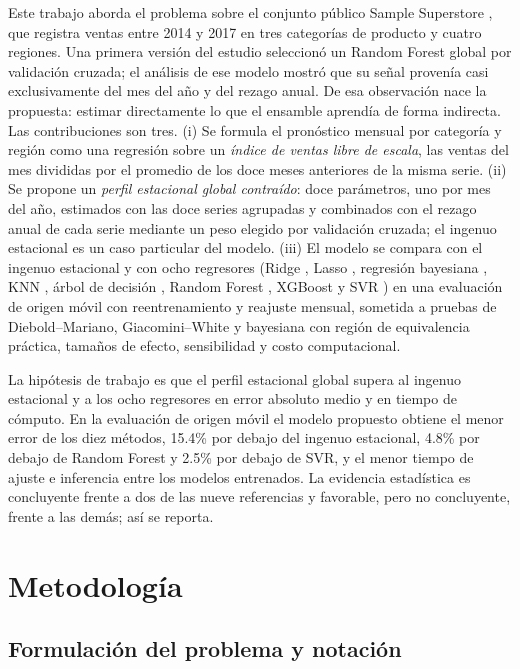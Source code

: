 \documentclass[pdflatex,sn-mathphys-num]{sn-jnl}
\begin{document}
Este trabajo aborda el problema sobre el conjunto público Sample Superstore \cite{superstore}, que registra ventas entre 2014 y 2017 en tres categorías de producto y cuatro regiones. Una primera versión del estudio seleccionó un Random Forest global por validación cruzada; el análisis de ese modelo mostró que su señal provenía casi exclusivamente del mes del año y del rezago anual. De esa observación nace la propuesta: estimar directamente lo que el ensamble aprendía de forma indirecta. Las contribuciones son tres. (i) Se formula el pronóstico mensual por categoría y región como una regresión sobre un \emph{índice de ventas libre de escala}, las ventas del mes divididas por el promedio de los doce meses anteriores de la misma serie. (ii) Se propone un \emph{perfil estacional global contraído}: doce parámetros, uno por mes del año, estimados con las doce series agrupadas y combinados con el rezago anual de cada serie mediante un peso elegido por validación cruzada; el ingenuo estacional es un caso particular del modelo. (iii) El modelo se compara con el ingenuo estacional y con ocho regresores (Ridge \cite{hoerl1970}, Lasso \cite{tibshirani1996}, regresión bayesiana \cite{mackay1992}, KNN \cite{cover1967}, árbol de decisión \cite{breiman1984}, Random Forest \cite{breiman2001}, XGBoost \cite{chen2016} y SVR \cite{drucker1997}) en una evaluación de origen móvil con reentrenamiento y reajuste mensual, sometida a pruebas de Diebold--Mariano, Giacomini--White y bayesiana con región de equivalencia práctica, tamaños de efecto, sensibilidad y costo computacional.

La hipótesis de trabajo es que el perfil estacional global supera al ingenuo estacional y a los ocho regresores en error absoluto medio y en tiempo de cómputo. En la evaluación de origen móvil el modelo propuesto obtiene el menor error de los diez métodos, 15.4\% por debajo del ingenuo estacional, 4.8\% por debajo de Random Forest y 2.5\% por debajo de SVR, y el menor tiempo de ajuste e inferencia entre los modelos entrenados. La evidencia estadística es concluyente frente a dos de las nueve referencias y favorable, pero no concluyente, frente a las demás; así se reporta.

\section{Metodología}\label{sec:metodologia}

\subsection{Formulación del problema y notación}\label{subsec:formulacion}
\end{document}
